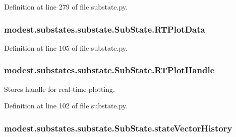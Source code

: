 Definition at line 279 of file substate.\+py.

\subsubsection[{\texorpdfstring{R\+T\+Plot\+Data}{RTPlotData}}]{\setlength{\rightskip}{0pt plus 5cm}modest.\+substates.\+substate.\+Sub\+State.\+R\+T\+Plot\+Data\hspace{0.3cm}{\ttfamily [inherited]}}\hypertarget{classmodest_1_1substates_1_1substate_1_1SubState_a9fefae1facc797a1132fb61a55e9ffa1}{}\label{classmodest_1_1substates_1_1substate_1_1SubState_a9fefae1facc797a1132fb61a55e9ffa1}


Definition at line 105 of file substate.\+py.

\subsubsection[{\texorpdfstring{R\+T\+Plot\+Handle}{RTPlotHandle}}]{\setlength{\rightskip}{0pt plus 5cm}modest.\+substates.\+substate.\+Sub\+State.\+R\+T\+Plot\+Handle\hspace{0.3cm}{\ttfamily [inherited]}}\hypertarget{classmodest_1_1substates_1_1substate_1_1SubState_a37ded775b84cea85b4dce0f1b16286c4}{}\label{classmodest_1_1substates_1_1substate_1_1SubState_a37ded775b84cea85b4dce0f1b16286c4}


Stores handle for real-\/time plotting. 



Definition at line 102 of file substate.\+py.

\subsubsection[{\texorpdfstring{state\+Vector\+History}{stateVectorHistory}}]{\setlength{\rightskip}{0pt plus 5cm}modest.\+substates.\+substate.\+Sub\+State.\+state\+Vector\+History\hspace{0.3cm}{\ttfamily [inherited]}}\hypertarget{classmodest_1_1substates_1_1substate_1_1SubState_a38c12c9d0899bc1161f3502b584517a2}{}\label{classmodest_1_1substates_1_1substate_1_1SubState_a38c12c9d0899bc1161f3502b584517a2}


